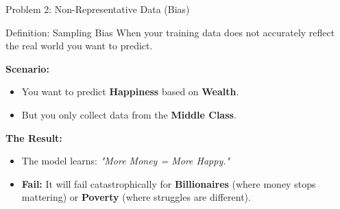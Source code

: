 \begin{frame}{Problem 2: Non-Representative Data (Bias)}

    \begin{alertblock}{Definition: Sampling Bias}
        When your training data does not accurately reflect the real world you want to predict.
    \end{alertblock}


    \begin{tcolorbox}[colback=blue!5, colframe=blue!50, title=Example: The "Happiness" Model]
        \textbf{Scenario:}
        \begin{itemize}
            \item You want to predict \textbf{Happiness} based on \textbf{Wealth}.
            \item But you only collect data from the \textbf{Middle Class}.
        \end{itemize}
        
        \vspace{0.5em}
        \textbf{The Result:}
        \begin{itemize}
            \item The model learns: \textit{"More Money = More Happy."}
            \item \textbf{Fail:} It will fail catastrophically for \textbf{Billionaires} (where money stops mattering) or \textbf{Poverty} (where struggles are different).
        \end{itemize}
    \end{tcolorbox}

\end{frame}

